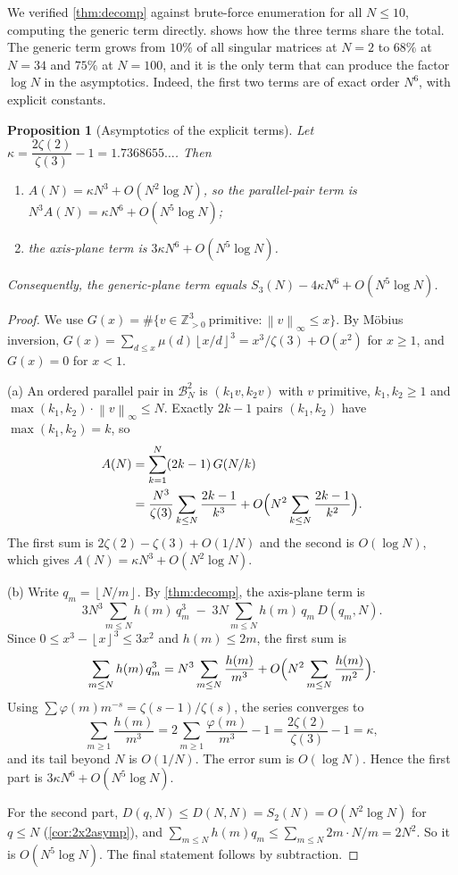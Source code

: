 \documentclass[11pt]{article}
\newtheorem{proposition}[theorem]{Proposition}
\theoremstyle{definition}
\newcommand{\Z}{\mathbb{Z}}
\newcommand{\BN}{\mathcal{B}_N}
\newcommand{\floor}[1]{\left\lfloor #1 \right\rfloor}
\newcommand{\norm}[1]{\left\lVert #1 \right\rVert}
\begin{document}
We verified \cref{thm:decomp} against brute-force enumeration for all $N\le 10$, computing the generic term directly.  shows how the three terms share the total. The generic term grows from $10\%$ of all singular matrices at $N=2$ to $68\%$ at $N=34$ and $75\%$ at $N=100$, and it is the only term that can produce the factor $\log N$ in the asymptotics. Indeed, the first two terms are of exact order $N^6$, with explicit constants.

\begin{proposition}[Asymptotics of the explicit terms]\label{prop:explicit}
Let $\kappa=\dfrac{2\zeta(2)}{\zeta(3)}-1=1.7368655\ldots$. Then
\begin{enumerate}[label=(\alph*)]
\item $A(N)=\kappa N^3+O(N^2\log N)$, so the parallel-pair term is $N^3A(N)=\kappa N^6+O(N^5\log N)$;
\item the axis-plane term is $3\kappa N^6+O(N^5\log N)$.
\end{enumerate}
Consequently, the generic-plane term equals $S_3(N)-4\kappa N^6+O(N^5\log N)$.
\end{proposition}

\begin{proof}
We use $G(x)=\#\{v\in\Z_{>0}^3\ \text{primitive}:\norm{v}_\infty\le x\}$. By Möbius inversion, $G(x)=\sum_{d\le x}\mu(d)\floor{x/d}^3=x^3/\zeta(3)+O(x^2)$ for $x\ge1$, and $G(x)=0$ for $x<1$.

(a) An ordered parallel pair in $\BN^2$ is $(k_1v,k_2v)$ with $v$ primitive, $k_1,k_2\ge1$ and $\max(k_1,k_2)\cdot\norm{v}_\infty\le N$. Exactly $2k-1$ pairs $(k_1,k_2)$ have $\max(k_1,k_2)=k$, so
\[
\begin{aligned}
A(N)&=\sum_{k=1}^{N}(2k-1)\,G(N/k)\\
&=\frac{N^3}{\zeta(3)}\sum_{k\le N}\frac{2k-1}{k^3}+O\Bigl(N^2\sum_{k\le N}\frac{2k-1}{k^2}\Bigr).
\end{aligned}
\]
The first sum is $2\zeta(2)-\zeta(3)+O(1/N)$ and the second is $O(\log N)$, which gives $A(N)=\kappa N^3+O(N^2\log N)$.

(b) Write $q_m=\floor{N/m}$. By \cref{thm:decomp}, the axis-plane term is
\[
3N^3\sum_{m\le N}h(m)\,q_m^3\;-\;3N\sum_{m\le N}h(m)\,q_m\,D(q_m,N).
\]
Since $0\le x^3-\floor{x}^3\le3x^2$ and $h(m)\le 2m$, the first sum is
\[
\sum_{m\le N}h(m)\,q_m^3=N^3\sum_{m\le N}\frac{h(m)}{m^{3}}+O\Bigl(N^2\sum_{m\le N}\frac{h(m)}{m^{2}}\Bigr).
\] Using $\sum\varphi(m)m^{-s}=\zeta(s-1)/\zeta(s)$, the series converges to
\[
\sum_{m\ge1}\frac{h(m)}{m^{3}}=2\sum_{m\ge1}\frac{\varphi(m)}{m^{3}}-1=\frac{2\zeta(2)}{\zeta(3)}-1=\kappa,
\]
and its tail beyond $N$ is $O(1/N)$. The error sum is $O(\log N)$. Hence the first part is $3\kappa N^6+O(N^5\log N)$.

For the second part, $D(q,N)\le D(N,N)=S_2(N)=O(N^2\log N)$ for $q\le N$ (\cref{cor:2x2asymp}), and $\sum_{m\le N}h(m)q_m\le\sum_{m\le N}2m\cdot N/m=2N^2$. So it is $O(N^5\log N)$. The final statement follows by subtraction.
\end{proof}
\end{document}
